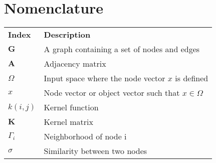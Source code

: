 \chapter*{Nomenclature}

{\centering
\begin{longtabu}{X[2cm,l] X[8cm,p,l]}


\\
\textbf{Index} & \textbf{Description}\\
$\textbf{G}$ & A graph containing a set of nodes and edges\\
$\textbf{A}$ & Adjacency matrix\\
$\Omega$ & Input space where the node vector $x$ is defined\\
$x$ & Node vector or object vector such that $x \in \Omega$\\
$k(i,j)$ & Kernel function\\
$\textbf{K}$ & Kernel matrix\\
$\Gamma_i$ & Neighborhood of node i\\
$\sigma$ & Similarity between two nodes\\

\end{longtabu}}

